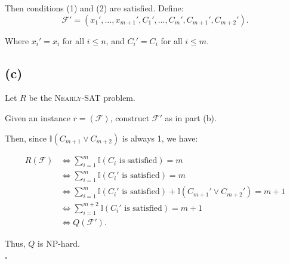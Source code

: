 Then conditions (1) and (2) are satisfied. Define:
\[
\mathcal{F}' = (x_1', \dots, x_{m+1}', C_1', \dots, C_m', C_{m+1}', C_{m+2}').
\]

Where $x_i' = x_i$ for all $i \leq n$, and $C_i' = C_i$ for all $i \leq m$.

\subsection*{(c)}
Let \( R \) be the \textsc{Nearly-SAT} problem.

Given an instance \( r = (\mathcal{F}) \), construct \( \mathcal{F}' \) as in part (b).

Then, since $\mathbb{I}(C_{m+1} \lor C_{m+2})$ is always 1, we have:

\begin{equation}
    \begin{split}
        R(\mathcal{F}) &\iff \sum_{i=1}^{m} \mathbb{I}(C_i \text{ is satisfied}) = m \\
        &\iff \sum_{i=1}^{m} \mathbb{I}(C_i' \text{ is satisfied}) = m \\
        &\iff \sum_{i=1}^{m} \mathbb{I}(C_i' \text{ is satisfied}) + \mathbb{I}(C_{m+1}' \lor C_{m+2}') = m + 1 \\
        &\iff \sum_{i=1}^{m+2} \mathbb{I}(C_i' \text{ is satisfied}) = m + 1 \\
        &\iff Q(\mathcal{F}').
    \end{split}
\end{equation}

Thus, \( Q \) is NP-hard.

\(\square\)

